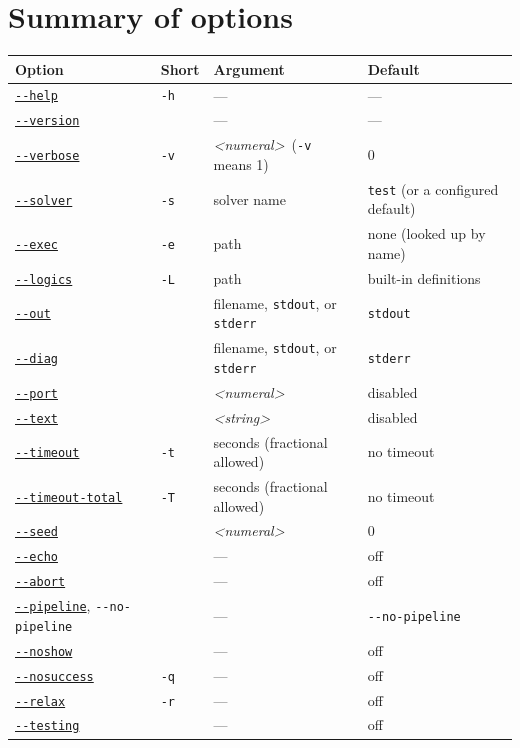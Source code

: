 \documentclass[12pt,oneside]{report}
\newcommand{\numeral}{{\it <numeral>}}
\newcommand{\strng}{{\it <string>}} %
\begin{document}
\section{Summary of options}

\begin{tabular}{|l|l|l|l|}
\hline
Option & Short & Argument & Default\\
\hline
\hyperref[opt:help]{\tt -{}-help} & {\tt -h} & --- & --- \\
\hyperref[opt:version]{\tt -{}-version} & & --- & ---  \\
\hyperref[opt:verbose]{\tt -{}-verbose} & {\tt -v} & \numeral\ ({\tt -v} means 1) & 0 \\
\hyperref[opt:solver]{\tt -{}-solver} & {\tt -s} & solver name & {\tt test} (or a configured default) \\
\hyperref[opt:exec]{\tt -{}-exec} & {\tt -e} & path & none (looked up by name) \\
\hyperref[opt:logics]{\tt -{}-logics} & {\tt -L} & path & built-in definitions \\
\hyperref[opt:out]{\tt -{}-out} & & filename, {\tt stdout}, or {\tt stderr} & {\tt stdout} \\
\hyperref[opt:diag]{\tt -{}-diag} & & filename, {\tt stdout}, or {\tt stderr} & {\tt stderr} \\
\hyperref[opt:port]{\tt -{}-port} & & \numeral & disabled \\
\hyperref[opt:text]{\tt -{}-text} & & \strng & disabled \\
\hyperref[opt:timeout]{\tt -{}-timeout} & {\tt -t} & seconds (fractional allowed) & no timeout \\
\hyperref[opt:timeouttotal]{\tt -{}-timeout-total} & {\tt -T} & seconds (fractional allowed) & no timeout \\
\hyperref[opt:seed]{\tt -{}-seed} & & \numeral & 0 \\
\hyperref[opt:echo]{\tt -{}-echo} & & --- & off \\
\hyperref[opt:abort]{\tt -{}-abort} & & --- & off \\
\hyperref[opt:pipeline]{\tt -{}-pipeline}, {\tt -{}-no-pipeline} & & --- & {\tt -{}-no-pipeline} \\
\hyperref[opt:noshow]{\tt -{}-noshow} & & --- & off \\
\hyperref[opt:nosuccess]{\tt -{}-nosuccess} & {\tt -q} & --- & off \\
\hyperref[opt:relax]{\tt -{}-relax} & {\tt -r} & --- & off \\
\hyperref[opt:testing]{\tt -{}-testing} & & --- & off \\
\hline
\end{tabular}
\end{document}

